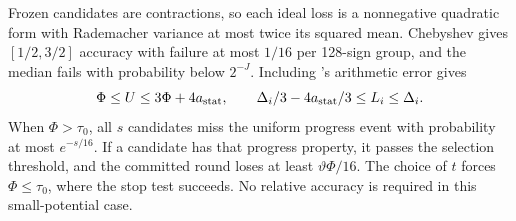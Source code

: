 \documentclass[11pt]{article}
\theoremstyle{remark}
\begin{document}
Frozen candidates are contractions, so each ideal loss is a nonnegative
quadratic form with Rademacher variance at most twice its squared mean.
Chebyshev gives $[1/2,3/2]$ accuracy with failure at most $1/16$ per 128-sign
group, and the median fails with probability below $2^{-J}$.
Including 's arithmetic error gives
\begin{equation}\label{struct27:eq:validation}
 \Phi\le U\le3\Phi+4a_{\rm stat},\qquad
 \Delta_i/3-4a_{\rm stat}/3\le L_i\le\Delta_i.
\end{equation}
When $\Phi>\tau_0$, all $s$ candidates miss the uniform progress event with
probability at most $e^{-s/16}$.
If a candidate has that progress property, it passes the selection threshold,
and the committed round loses at least $\vartheta\Phi/16$.
The choice of $t$ forces $\Phi\le\tau_0$, where the stop test succeeds.
No relative accuracy is required in this small-potential case.
\end{document}
